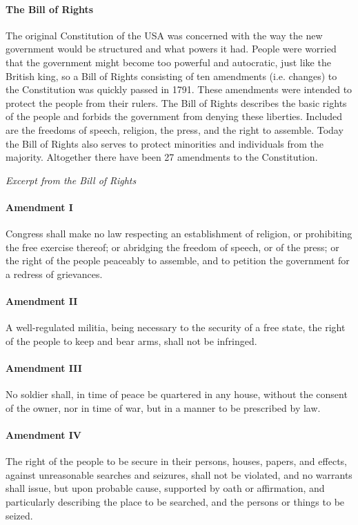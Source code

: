 \documentclass[10pt]{article}
\begin{document}
\paragraph{The Bill of Rights}\label{par:usa/const/bill}
The original Constitution of the USA was concerned with the way the new government would be
structured and what powers it had. People were worried that the government might become too
powerful and autocratic, just like the British king, so a Bill of Rights consisting of ten amendments
(i.e. changes) to the Constitution was quickly passed in 1791. These amendments were intended to
protect the people from their rulers. The Bill of Rights describes the basic rights of the people and
forbids the government from denying these liberties. Included are the freedoms of speech, religion,
the press, and the right to assemble. Today the Bill of Rights also serves to protect minorities and
individuals from the majority. Altogether there have been 27 amendments to the Constitution.
\begin{example}
\textit{Excerpt from the Bill of Rights}
\paragraph{Amendment I}\label{par:usa/const/bill/I}
Congress shall make no law respecting an establishment of religion, or prohibiting the free exercise thereof; or abridging
the freedom of speech, or of the press; or the right of the people peaceably to assemble, and to petition the government
for a redress of grievances.

\paragraph{Amendment II}\label{par:usa/const/bill/II}
A well-regulated militia, being necessary to the security of a free state, the right of the people to keep and bear arms, shall
not be infringed.

\paragraph{Amendment III}\label{par:usa/const/bill/III}
No soldier shall, in time of peace be quartered in any house, without the consent of the owner, nor in time of war, but in a
manner to be prescribed by law.

\paragraph{Amendment IV}\label{par:usa/const/bill/IV}
The right of the people to be secure in their persons, houses, papers, and effects, against unreasonable searches and
seizures, shall not be violated, and no warrants shall issue, but upon probable cause, supported by oath or affirmation, and
particularly describing the place to be searched, and the persons or things to be seized.
\end{example}
\end{document}
